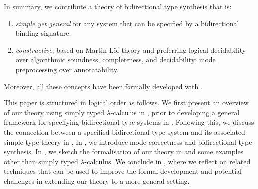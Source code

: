 In summary, we contribute a theory of bidirectional type synthesis that is:
\begin{enumerate}
  \item \emph{simple yet general} for any system that can be specified by a bidirectional binding signature;
  \item \emph{constructive}, based on Martin-L\"of theory and preferring logical decidability over algorithmic soundness, completeness, and decidability; mode preprocessing over annotatability.
\end{enumerate}
Moreover, all these concepts have been formally developed with \Agda.

This paper is structured in logical order as follows.
We first present an overview of our theory using simply typed $\lambda$-calculus in , prior to developing a general framework for specifying bidirectional type systems in .
Following this, we discuss the connection between a specified bidirectional type system and its associated simple type theory in .
In , we introduce mode-correctness and bidirectional type synthesis.
In , we sketch the formalisation of our theory in \Agda and some examples other than simply typed $\lambda$-calculus.
We conclude in , where we reflect on related techniques that can be used to improve the formal development and potential challenges in extending our theory to a more general setting.

